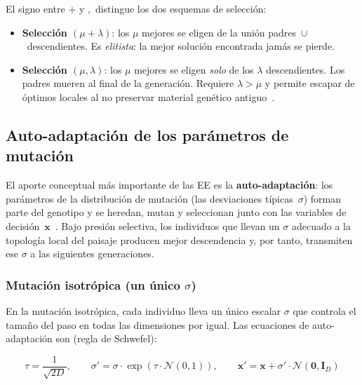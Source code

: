 \documentclass[12pt,letterpaper]{article}
\begin{document}
El signo entre $+$ y $,$ distingue los dos esquemas de selección:

\begin{itemize}[leftmargin=2.2em, itemsep=3pt]
    \item \textbf{Selección $(\mu+\lambda)$}: los $\mu$ mejores se eligen de la unión padres~$\cup$~descendientes. Es \emph{elitista}: la mejor solución encontrada jamás se pierde.
    \item \textbf{Selección $(\mu,\lambda)$}: los $\mu$ mejores se eligen \emph{solo} de los $\lambda$ descendientes. Los padres mueren al final de la generación. Requiere $\lambda>\mu$ y permite escapar de óptimos locales al no preservar material genético antiguo~\cite{eiben2015}.
\end{itemize}

\subsection{Auto-adaptación de los parámetros de mutación}

El aporte conceptual más importante de las EE es la \textbf{auto-adaptación}: los parámetros de la distribución de mutación (las desviaciones típicas~$\sigma$) forman parte del genotipo y se heredan, mutan y seleccionan junto con las variables de decisión~$\mathbf{x}$~\cite{beyer1995,beyer2001}. Bajo presión selectiva, los individuos que llevan un $\sigma$ adecuado a la topología local del paisaje producen mejor descendencia y, por tanto, transmiten ese $\sigma$ a las siguientes generaciones.

\subsubsection{Mutación isotrópica (un único \texorpdfstring{$\sigma$}{sigma})}

En la mutación isotrópica, cada individuo lleva un único escalar $\sigma$ que controla el tamaño del paso en todas las dimensiones por igual. Las ecuaciones de auto-adaptación son (regla de Schwefel):

\begin{formulabox}
\begin{equation}
    \tau = \frac{1}{\sqrt{2D}}, \qquad
    \sigma' = \sigma\cdot\exp\!\left(\tau\cdot\mathcal{N}(0,1)\right),\qquad
    \mathbf{x}' = \mathbf{x} + \sigma'\cdot\mathcal{N}(\mathbf{0},\mathbf{I}_D)
    \label{eq:iso}
\end{equation}
\end{formulabox}
\end{document}
